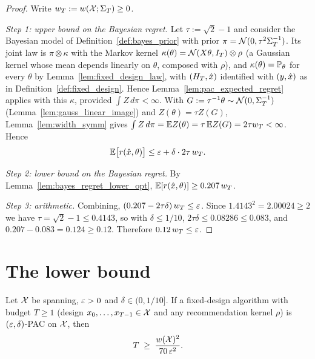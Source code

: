 \begin{proof}
\leanok
{}
Write $w_T := w(\mathcal{X};\Sigma_T) \ge 0$.

\emph{Step 1: upper bound on the Bayesian regret.} Let $\tau := \sqrt2 - 1$ and consider the
Bayesian model of Definition~\ref{def:bayes_prior} with prior $\pi = \mathcal{N}(0,\tau^2\Sigma_T^{-1})$.
Its joint law is $\pi \otimes \kappa$ with the Markov kernel
$\kappa(\theta) = \mathcal{N}(X\theta, I_T) \otimes \rho$ (a Gaussian kernel whose mean depends
linearly on $\theta$, composed with $\rho$), and $\kappa(\theta) = \mathbb{P}_\theta$ for every
$\theta$ by Lemma~\ref{lem:fixed_design_law}, with $(H_T, \hat{x})$ identified with
$(y, \hat{x})$ as in Definition~\ref{def:fixed_design}. Hence Lemma~\ref{lem:pac_expected_regret}
applies with this $\kappa$, provided $\int Z\,d\pi < \infty$. With $G := \tau^{-1}\theta \sim \mathcal{N}(0,\Sigma_T^{-1})$
(Lemma~\ref{lem:gauss_linear_image}) and $Z(\theta) = \tau Z(G)$, Lemma~\ref{lem:width_symm}
gives $\int Z\,d\pi = \mathbb{E} Z(\theta) = \tau\,\mathbb{E} Z(G) = 2\tau w_T < \infty$. Hence
\[
  \mathbb{E}\big[r(\hat{x},\theta)\big] \le \varepsilon + \delta \cdot 2\tau\, w_T .
\]

\emph{Step 2: lower bound on the Bayesian regret.} By Lemma~\ref{lem:bayes_regret_lower_opt},
$\mathbb{E}[r(\hat{x},\theta)] \ge 0.207\, w_T$.

\emph{Step 3: arithmetic.} Combining, $(0.207 - 2\tau\delta)\, w_T \le \varepsilon$. Since
$1.4143^2 = 2.00024 \ge 2$ we have $\tau = \sqrt2 - 1 \le 0.4143$, so with $\delta \le 1/10$,
$2\tau\delta \le 0.08286 \le 0.083$, and $0.207 - 0.083 = 0.124 \ge 0.12$. Therefore
$0.12\, w_T \le \varepsilon$.
\end{proof}

\section{The lower bound}
\label{sec:lower_nonadaptive_theorem}

\begin{theorem}\label{thm:lower_nonadaptive}
\leanok
{}
Let $\mathcal{X}$ be spanning, $\varepsilon > 0$ and $\delta \in (0, 1/10]$. If a fixed-design algorithm with budget $T \ge 1$
(design $x_0,\dots,x_{T-1} \in \mathcal{X}$ and any recommendation kernel $\rho$) is
$(\varepsilon,\delta)$-PAC on $\mathcal{X}$, then
\[
  T \;\ge\; \frac{w(\mathcal{X})^2}{70\,\varepsilon^2} .
\]
\end{theorem}


